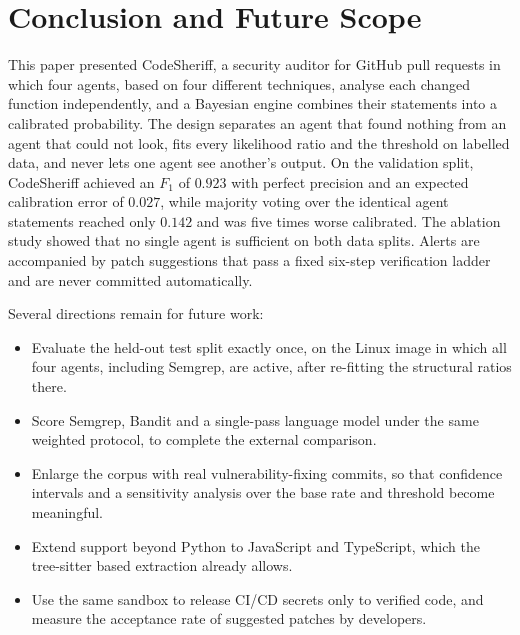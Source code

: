 \documentclass[conference]{IEEEtran}
\begin{document}
\section{Conclusion and Future Scope} \label{CON}

This paper presented CodeSheriff, a security auditor for GitHub pull
requests in which four agents, based on four different techniques, analyse
each changed function independently, and a Bayesian engine combines their
statements into a calibrated probability. The design separates an agent
that found nothing from an agent that could not look, fits every
likelihood ratio and the threshold on labelled data, and never lets one
agent see another's output. On the validation split, CodeSheriff achieved
an $F_1$ of $0.923$ with perfect precision and an expected calibration
error of $0.027$, while majority voting over the identical agent
statements reached only $0.142$ and was five times worse calibrated. The
ablation study showed that no single agent is sufficient on both data
splits. Alerts are accompanied by patch suggestions that pass a fixed
six-step verification ladder and are never committed automatically.

Several directions remain for future work:
\begin{itemize}
\item Evaluate the held-out test split exactly once, on the Linux image in
which all four agents, including Semgrep, are active, after re-fitting the
structural ratios there.
\item Score Semgrep, Bandit and a single-pass language model under the same
weighted protocol, to complete the external comparison.
\item Enlarge the corpus with real vulnerability-fixing commits, so that
confidence intervals and a sensitivity analysis over the base rate and
threshold become meaningful.
\item Extend support beyond Python to JavaScript and TypeScript, which the
tree-sitter based extraction already allows.
\item Use the same sandbox to release CI/CD secrets only to verified code,
and measure the acceptance rate of suggested patches by developers.
\end{itemize}



\end{document}
